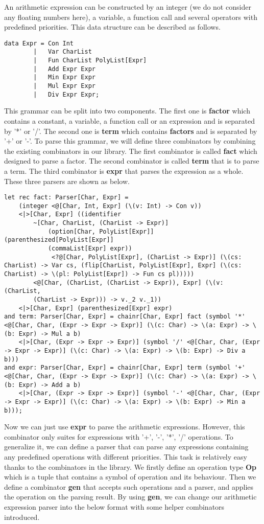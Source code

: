 An arithmetic expression can be constructed by an integer (we do not consider any floating numbers here), a variable, a function call and several operators with predefined priorities. This data structure can be described as follows.
\begin{lstlisting}
data Expr = Con Int
        |   Var CharList
        |   Fun CharList PolyList[Expr]
        |   Add Expr Expr
        |   Min Expr Expr
        |   Mul Expr Expr
        |   Div Expr Expr;
\end{lstlisting}
This grammar can be split into two components. The first one is \textbf{factor} which contains a constant, a variable, a function call or an expression and is separated by '*' or '/'.  The second one is \textbf{term} which contains \textbf{factors} and is separated by '+' or '-'.
To parse this grammar, we will define three combinators by combining the existing combinators in our library. The first combinator is called \textbf{fact} which designed to parse a factor. The second combinator is called \textbf{term} that is to parse a term. The third combinator is \textbf{expr} that parses the expression as a whole. These three parsers are shown as below.
\begin{lstlisting}
let rec fact: Parser[Char, Expr] =
    (integer <@[Char, Int, Expr] (\(v: Int) -> Con v))
    <|>[Char, Expr] ((identifier 
        ~[Char, CharList, (CharList -> Expr)]
            (option[Char, PolyList[Expr]] (parenthesized[PolyList[Expr]] 
            (commaList[Expr] expr))
             <?@[Char, PolyList[Expr], (CharList -> Expr)] (\(cs: CharList) -> Var cs, (flip[CharList, PolyList[Expr], Expr] (\(cs: CharList) -> \(pl: PolyList[Expr]) -> Fun cs pl)))))
        <@[Char, (CharList, (CharList -> Expr)), Expr] (\(v: (CharList, 
        (CharList -> Expr))) -> v._2 v._1))
    <|>[Char, Expr] (parenthesized[Expr] expr)
and term: Parser[Char, Expr] = chainr[Char, Expr] fact (symbol '*' <@[Char, Char, (Expr -> Expr -> Expr)] (\(c: Char) -> \(a: Expr) -> \(b: Expr) -> Mul a b)
    <|>[Char, (Expr -> Expr -> Expr)] (symbol '/' <@[Char, Char, (Expr -> Expr -> Expr)] (\(c: Char) -> \(a: Expr) -> \(b: Expr) -> Div a b)))
and expr: Parser[Char, Expr] = chainr[Char, Expr] term (symbol '+' <@[Char, Char, (Expr -> Expr -> Expr)] (\(c: Char) -> \(a: Expr) -> \(b: Expr) -> Add a b)
    <|>[Char, (Expr -> Expr -> Expr)] (symbol '-' <@[Char, Char, (Expr -> Expr -> Expr)] (\(c: Char) -> \(a: Expr) -> \(b: Expr) -> Min a b)));
\end{lstlisting}
Now we can just use \textbf{expr} to parse the arithmetic expressions. However, this combinator only suites for expressions with '+', '-', '*', '/' operations. To generalize it, we can define a parser that can parse any expressions containing any predefined operations with different priorities. This task is relatively easy thanks to the combinators in the library. We firstly define an operation type \textbf{Op} which is a tuple that contains a symbol of operation and its behaviour. Then we define a combinator \textbf{gen} that accepts such operations and a parser, and applies the operation on the parsing result. By using \textbf{gen}, we can change our arithmetic expression parser into the below format with some helper combinators introduced.
